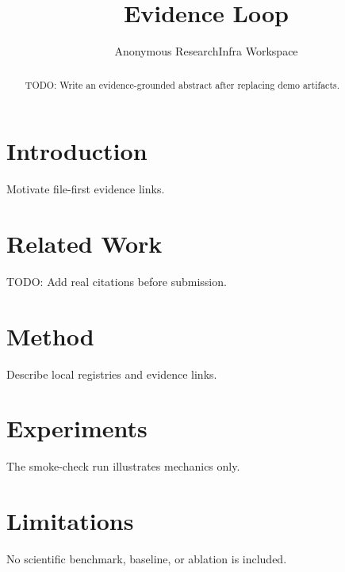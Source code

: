 \documentclass{article}
\title{Evidence Loop}
\author{Anonymous ResearchInfra Workspace}
\begin{document}
\maketitle
\begin{abstract}
TODO: Write an evidence-grounded abstract after replacing demo artifacts.
\end{abstract}
\section{Introduction}
Motivate file-first evidence links.
\section{Related Work}
TODO: Add real citations before submission.
\section{Method}
Describe local registries and evidence links.
\section{Experiments}
The smoke-check run illustrates mechanics only.
\section{Limitations}
No scientific benchmark, baseline, or ablation is included.


\end{document}
